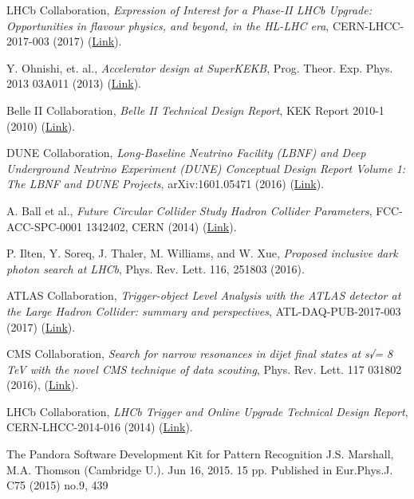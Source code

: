 \documentclass[11pt,letterpaper,fleqn]{article}
\begin{document}
\begin{thebibliography}{99}
LHCb Collaboration, 
\textit{Expression of Interest for a Phase-II LHCb Upgrade: Opportunities in flavour physics, and beyond, in the HL-LHC era},  
CERN-LHCC-2017-003 (2017) (\href{https://cds.cern.ch/record/2244311}{Link}).
  
Y. Ohnishi, et. al., 
\textit{Accelerator design at SuperKEKB}, 
Prog. Theor. Exp. Phys. 2013 03A011 (2013) (\href{http://dx.doi.org/10.1093/ptep/pts083}{Link}). 

Belle II Collaboration, 
\textit{Belle II Technical Design Report}, 
KEK Report 2010-1 (2010) (\href{https://arxiv.org/abs/1011.0352}{Link}).

DUNE Collaboration, 
\textit{Long-Baseline Neutrino Facility (LBNF) and Deep Underground Neutrino Experiment (DUNE) Conceptual Design Report Volume 1: The LBNF and DUNE Projects}, 
arXiv:1601.05471 (2016) (\href{https://arxiv.org/abs/1601.05471}{Link}). 

A. Ball et al., 
\textit{Future Circular Collider Study Hadron Collider Parameters}, 
FCC-ACC-SPC-0001 1342402, CERN (2014) (\href{https://indico.cern.ch/event/...FCC-1401101315-DSC\_HadronColliderParameters\_V0.3.pdf}{Link}).

P. Ilten, Y. Soreq, J. Thaler, M. Williams, and W. Xue, 
\textit{Proposed inclusive dark photon search at LHCb}, 
Phys. Rev. Lett. 116, 251803 (2016). 

ATLAS Collaboration,
\textit{Trigger-object Level Analysis with the ATLAS detector at the Large Hadron Collider: summary and perspectives}, 
ATL-DAQ-PUB-2017-003 (2017) (\href{https://cds.cern.ch/record/2295739}{Link}).

CMS Collaboration,
\textit{Search for narrow resonances in dijet final states at s√= 8 TeV with the novel CMS technique of data scouting},
Phys. Rev. Lett. 117 031802 (2016), (\href{https://cds.cern.ch/record/2149625}{Link}). 

LHCb Collaboration, 
\textit{LHCb Trigger and Online Upgrade Technical Design Report},
CERN-LHCC-2014-016 (2014) (\href{https://cds.cern.ch/record/1701361}{Link}).

 The Pandora Software Development Kit for Pattern Recognition
J.S. Marshall, M.A. Thomson (Cambridge U.). Jun 16, 2015. 15 pp.
Published in Eur.Phys.J. C75 (2015) no.9, 439


\end{thebibliography}
\end{document}
